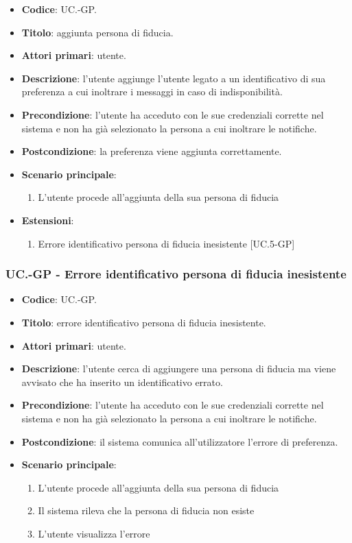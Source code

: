 		\begin{itemize}
			\item \textbf{Codice}: UC\theuccount.\thesubuccount-GP.
			\item \textbf{Titolo}: aggiunta persona di fiducia.
			\item \textbf{Attori primari}: utente.
			\item \textbf{Descrizione}: l’utente aggiunge l'utente legato a un identificativo di sua preferenza a cui inoltrare i messaggi in caso di indisponibilità.
			\item \textbf{Precondizione}: l’utente ha acceduto con le sue credenziali corrette nel sistema e non ha già selezionato la persona a cui inoltrare le notifiche.
			\item \textbf{Postcondizione}: la preferenza viene aggiunta correttamente.
			\item \textbf{Scenario principale}:
			\begin{enumerate}
				\item L'utente procede all'aggiunta della sua persona di fiducia
			\end{enumerate}
			\item \textbf{Estensioni}:
			\begin{enumerate}
				\item Errore identificativo persona di fiducia inesistente [UC\theuccount.5-GP]
			\end{enumerate}
		\end{itemize}
	
	\subsubsection{UC\theuccount.\thesubuccount-GP - Errore identificativo persona di fiducia inesistente}
		
		\begin{itemize}
			\item \textbf{Codice}: UC\theuccount.\thesubuccount-GP.
			\item \textbf{Titolo}: errore identificativo persona di fiducia inesistente.
			\item \textbf{Attori primari}: utente.
			\item \textbf{Descrizione}: l’utente cerca di aggiungere una persona di fiducia ma viene avvisato che ha inserito un identificativo errato.
			\item \textbf{Precondizione}: l’utente ha acceduto con le sue credenziali corrette nel sistema e non ha già selezionato la persona a cui inoltrare le notifiche.
			\item \textbf{Postcondizione}: il sistema comunica all’utilizzatore l’errore di preferenza.
			\item \textbf{Scenario principale}:
			\begin{enumerate}
				\item L'utente procede all'aggiunta della sua persona di fiducia
				\item Il sistema rileva che la persona di fiducia non esiste
				\item L'utente visualizza l'errore
			\end{enumerate}
		\end{itemize}
	
